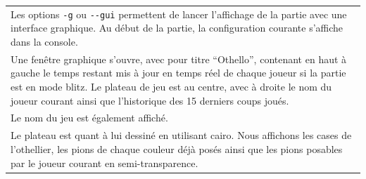 \documentclass[a4paper,12pt]{article}
\begin{document}
\begin{tabularx}{\textwidth}{|X|}
    \hline
    Les options \texttt{-g} ou \texttt{-}\texttt{-gui} permettent de lancer l’affichage de la partie avec une interface graphique. Au début de la partie, la configuration courante s’affiche dans la console.                                                                                                                                                                                                                                                                                                                                                                                                                  \\
    Une fenêtre graphique s’ouvre, avec pour titre “Othello”, contenant en haut à gauche le temps restant mis à jour en temps réel de chaque joueur si la partie est en mode blitz. Le plateau de jeu est au centre, avec à droite le nom du joueur courant ainsi que l’historique des 15 derniers coups joués.                                                                                                                                                                                                                                                                                                                 \\
    Le nom du jeu est également affiché.                                                                                                                                                                                                                                                                                                                                                                                                                                                                                                                                                                                        \\
    Le plateau est quant à lui dessiné en utilisant cairo. Nous affichons les cases de l’othellier, les pions de chaque couleur déjà posés ainsi que les pions posables par le joueur courant en semi-transparence.                                                                                                                                                                                                                                                                                                                                                                                                             \\

\end{tabularx}
\end{document}
